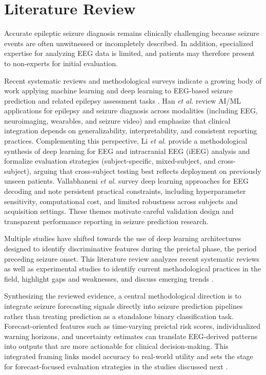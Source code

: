 \documentclass[conference]{IEEEtran}
\begin{document}
\section{Literature Review}
Accurate epileptic seizure diagnosis remains clinically challenging because seizure events are often unwitnessed or incompletely described. In addition, specialized expertise for analyzing EEG data is limited, and patients may therefore present to non-experts for initial evaluation.

Recent systematic reviews and methodological surveys indicate a growing body of work applying machine learning and deep learning to EEG-based seizure prediction and related epilepsy assessment tasks \cite{han2024epilepsycare,li2025signalsanalysis,vallabhaneni2021eegdecoding}. Han \textit{et al.} \cite{han2024epilepsycare} review AI/ML applications for epilepsy and seizure diagnosis across modalities (including EEG, neuroimaging, wearables, and seizure video) and emphasize that clinical integration depends on generalizability, interpretability, and consistent reporting practices. Complementing this perspective, Li \textit{et al.} \cite{li2025signalsanalysis} provide a methodological synthesis of deep learning for EEG and intracranial EEG (iEEG) analysis and formalize evaluation strategies (subject-specific, mixed-subject, and cross-subject), arguing that cross-subject testing best reflects deployment on previously unseen patients. Vallabhaneni \textit{et al.} \cite{vallabhaneni2021eegdecoding} survey deep learning approaches for EEG decoding and note persistent practical constraints, including hyperparameter sensitivity, computational cost, and limited robustness across subjects and acquisition settings. These themes motivate careful validation design and transparent performance reporting in seizure prediction research.

Multiple studies have shifted towards the use of deep learning architectures designed to identify discriminative features during the preictal phase, the period preceding seizure onset. This literature review analyzes recent systematic reviews as well as experimental studies to identify current methodological practices in the field, highlight gaps and weaknesses, and discuss emerging trends \cite{carmo2024seizureforecast,shafiezadeh2024crosspatient,mourad2025seizurerecognition,sobhona2023sysreview}.

Synthesizing the reviewed evidence, a central methodological direction is to integrate seizure forecasting signals directly into seizure prediction pipelines rather than treating prediction as a standalone binary classification task. Forecast-oriented features such as time-varying preictal risk scores, individualized warning horizons, and uncertainty estimates can translate EEG-derived patterns into outputs that are more actionable for clinical decision-making. This integrated framing links model accuracy to real-world utility and sets the stage for forecast-focused evaluation strategies in the studies discussed next \cite{carmo2024seizureforecast}. %
\end{document}
